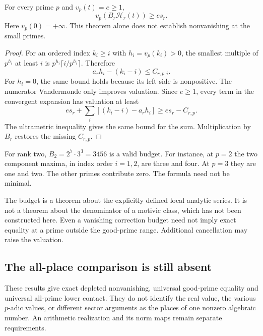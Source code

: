 \begin{theorem}\label{thm:budget}
For every prime $p$ and $v_p(t)=e\ge1$,
\[
 \boxed{v_p(B_r\mathcal H_r(t))\ge es_r.}
\]
Here $v_p(0)=+\infty$. This theorem alone does not establish nonvanishing at the small primes.
\end{theorem}
\begin{proof}
For an ordered index $k_i\ge i$ with $h_i=v_p(k_i)>0$, the smallest multiple of $p^{h_i}$ at least $i$ is $p^{h_i}\lceil i/p^{h_i}\rceil$. Therefore
\[
 a_rh_i-(k_i-i)\le C_{r,p,i}.
\]
For $h_i=0$, the same bound holds because its left side is nonpositive. The numerator Vandermonde only improves valuation. Since $e\ge1$, every term in the convergent expansion has valuation at least
\[
 es_r+\sum_i[(k_i-i)-a_rh_i]\ge es_r-C_{r,p}.
\]
The ultrametric inequality gives the same bound for the sum. Multiplication by $B_r$ restores the missing $C_{r,p}$.
\end{proof}
For rank two, $B_2=2^7\cdot3^3=3456$ is a valid budget. For instance, at $p=2$ the two component maxima, in index order $i=1,2$, are three and four. At $p=3$ they are one and two. The other primes contribute zero. The formula need not be minimal.

The budget is a theorem about the explicitly defined local analytic series. It is not a theorem about the denominator of a motivic class, which has not been constructed here. Even a vanishing correction budget need not imply exact equality at a prime outside the good-prime range. Additional cancellation may raise the valuation.

\subsection{The all-place comparison is still absent}
These results give exact depleted nonvanishing, universal good-prime equality and universal all-prime lower contact. They do not identify the real value, the various $p$-adic values, or different sector arguments as the places of one nonzero algebraic number. An arithmetic realization and its norm maps remain separate requirements.
